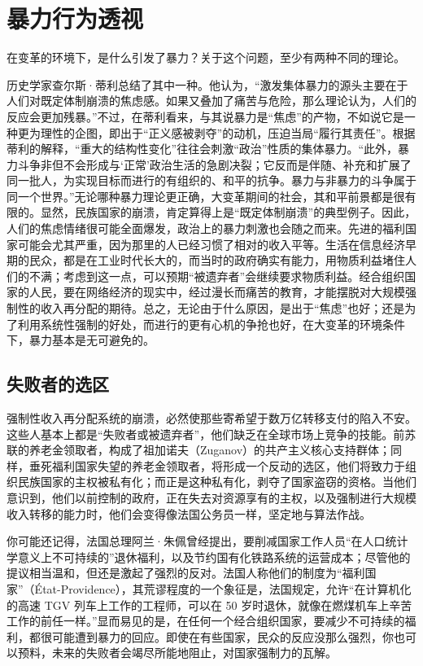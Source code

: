\section{暴力行为透视}

在变革的环境下，是什么引发了暴力？关于这个问题，至少有两种不同的理论。

历史学家查尔斯·蒂利总结了其中一种。他认为，“激发集体暴力的源头主要在于人们对既定体制崩溃的焦虑感。如果又叠加了痛苦与危险，那么理论认为，人们的反应会更加残暴。”不过，在蒂利看来，与其说暴力是“焦虑”的产物，不如说它是一种更为理性的企图，即出于“正义感被剥夺”的动机，压迫当局“履行其责任”。根据蒂利的解释，“重大的结构性变化”往往会刺激“政治”性质的集体暴力。“此外，暴力斗争非但不会形成与‘正常’政治生活的急剧决裂；它反而是伴随、补充和扩展了同一批人，为实现目标而进行的有组织的、和平的抗争。暴力与非暴力的斗争属于同一个世界。”无论哪种暴力理论更正确，大变革期间的社会，其和平前景都是很有限的。显然，民族国家的崩溃，肯定算得上是“既定体制崩溃”的典型例子。因此，人们的焦虑情绪很可能全面爆发，政治上的暴力刺激也会随之而来。先进的福利国家可能会尤其严重，因为那里的人已经习惯了相对的收入平等。生活在信息经济早期的民众，都是在工业时代长大的，而当时的政府确实有能力，用物质利益堵住人们的不满；考虑到这一点，可以预期“被遗弃者”会继续要求物质利益。经合组织国家的人民，要在网络经济的现实中，经过漫长而痛苦的教育，才能摆脱对大规模强制性的收入再分配的期待。总之，无论由于什么原因，是出于“焦虑”也好；还是为了利用系统性强制的好处，而进行的更有心机的争抢也好，在大变革的环境条件下，暴力基本是无可避免的。

\subsection{失败者的选区}

强制性收入再分配系统的崩溃，必然使那些寄希望于数万亿转移支付的陷入不安。这些人基本上都是“失败者或被遗弃者”，他们缺乏在全球市场上竞争的技能。前苏联的养老金领取者，构成了祖加诺夫（Zuganov）的共产主义核心支持群体；同样，垂死福利国家失望的养老金领取者，将形成一个反动的选区，他们将致力于组织民族国家的主权被私有化；而正是这种私有化，剥夺了国家盗窃的资格。当他们意识到，他们以前控制的政府，正在失去对资源享有的主权，以及强制进行大规模收入转移的能力时，他们会变得像法国公务员一样，坚定地与算法作战。

你可能还记得，法国总理阿兰·朱佩曾经提出，要削减国家工作人员“在人口统计学意义上不可持续的”退休福利，以及节约国有化铁路系统的运营成本；尽管他的提议相当温和，但还是激起了强烈的反对。法国人称他们的制度为“福利国家”（État-Providence），其荒谬程度的一个象征是，法国规定，允许“在计算机化的高速 TGV 列车上工作的工程师，可以在 50 岁时退休，就像在燃煤机车上辛苦工作的前任一样。”显而易见的是，在任何一个经合组织国家，要减少不可持续的福利，都很可能遭到暴力的回应。即使在有些国家，民众的反应没那么强烈，你也可以预料，未来的失败者会竭尽所能地阻止，对国家强制力的瓦解。

